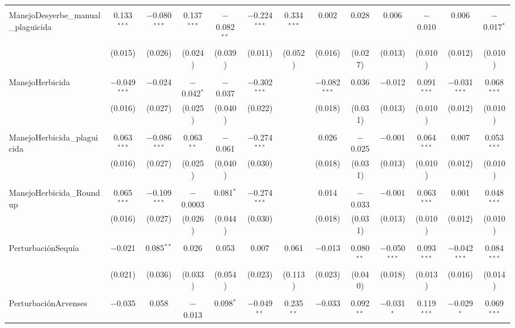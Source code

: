 \documentclass[spanish,11pt]{article}
\begin{document}
\begin{table}[!htbp]
\begin{tabular}{@{\extracolsep{5pt}}lcccccccccccc}
  & & & & & & & & & & & & \\ 
 ManejoDesyerbe\_manual\_plaguicida & 0.133$^{***}$ & $-$0.080$^{***}$ & 0.137$^{***}$ & $-$0.082$^{**}$ & $-$0.224$^{***}$ & 0.334$^{***}$ & 0.002 & 0.028 & 0.006 & $-$0.010 & 0.006 & $-$0.017$^{*}$ \\ 
  & (0.015) & (0.026) & (0.024) & (0.039) & (0.011) & (0.052) & (0.016) & (0.027) & (0.013) & (0.010) & (0.012) & (0.010) \\ 
  & & & & & & & & & & & & \\ 
 ManejoHerbicida & $-$0.049$^{***}$ & $-$0.024 & $-$0.042$^{*}$ & $-$0.037 & $-$0.302$^{***}$ &  & $-$0.082$^{***}$ & 0.036 & $-$0.012 & 0.091$^{***}$ & $-$0.031$^{***}$ & 0.068$^{***}$ \\ 
  & (0.016) & (0.027) & (0.025) & (0.040) & (0.022) &  & (0.018) & (0.031) & (0.013) & (0.010) & (0.012) & (0.010) \\ 
  & & & & & & & & & & & & \\ 
 ManejoHerbicida\_plaguicida & 0.063$^{***}$ & $-$0.086$^{***}$ & 0.063$^{**}$ & $-$0.061 & $-$0.274$^{***}$ &  & 0.026 & $-$0.025 & $-$0.001 & 0.064$^{***}$ & 0.007 & 0.053$^{***}$ \\ 
  & (0.016) & (0.027) & (0.025) & (0.040) & (0.030) &  & (0.018) & (0.031) & (0.013) & (0.010) & (0.012) & (0.010) \\ 
  & & & & & & & & & & & & \\ 
 ManejoHerbicida\_Roundup & 0.065$^{***}$ & $-$0.109$^{***}$ & $-$0.0003 & 0.081$^{*}$ & $-$0.274$^{***}$ &  & 0.014 & $-$0.033 & $-$0.001 & 0.063$^{***}$ & 0.001 & 0.048$^{***}$ \\ 
  & (0.016) & (0.027) & (0.026) & (0.044) & (0.030) &  & (0.018) & (0.031) & (0.013) & (0.010) & (0.012) & (0.010) \\ 
  & & & & & & & & & & & & \\ 
 PerturbaciónSequía & $-$0.021 & 0.085$^{**}$ & 0.026 & 0.053 & 0.007 & 0.061 & $-$0.013 & 0.080$^{**}$ & $-$0.050$^{***}$ & 0.093$^{***}$ & $-$0.042$^{***}$ & 0.084$^{***}$ \\ 
  & (0.021) & (0.036) & (0.033) & (0.054) & (0.023) & (0.113) & (0.023) & (0.040) & (0.018) & (0.013) & (0.016) & (0.014) \\ 
  & & & & & & & & & & & & \\ 
 PerturbaciónArvenses & $-$0.035 & 0.058 & $-$0.013 & 0.098$^{*}$ & $-$0.049$^{**}$ & 0.235$^{**}$ & $-$0.033 & 0.092$^{**}$ & $-$0.031$^{*}$ & 0.119$^{***}$ & $-$0.029$^{*}$ & 0.069$^{***}$ \\ 

\end{tabular}
\end{table}
\end{document}
